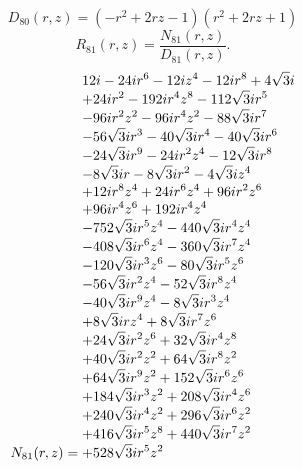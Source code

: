\documentclass[11pt,a4paper]{article}
\begin{document}
\begin{equation}
D_{80}(r,z)=\left(- r^{2} + 2 r z - 1\right) \left(r^{2} + 2 r z + 1\right)
\label{eq:cat-denominator-80}
\end{equation}
\begin{equation}
R_{81}(r,z)=\frac{N_{81}(r,z)}{D_{81}(r,z)}.
\label{eq:cat-rational-81}
\end{equation}
\begin{equation}
N_{81}(r,z)=\shortstack[l]{$\displaystyle 12 i - 24 i r^{6} - 12 i z^{4} - 12 i r^{8} + 4 \sqrt{3} i$\\
$\displaystyle  + 24 i r^{2} - 192 i r^{4} z^{8} - 112 \sqrt{3} i r^{5}$\\
$\displaystyle  - 96 i r^{2} z^{2} - 96 i r^{4} z^{2} - 88 \sqrt{3} i r^{7}$\\
$\displaystyle  - 56 \sqrt{3} i r^{3} - 40 \sqrt{3} i r^{4} - 40 \sqrt{3} i r^{6}$\\
$\displaystyle  - 24 \sqrt{3} i r^{9} - 24 i r^{2} z^{4} - 12 \sqrt{3} i r^{8}$\\
$\displaystyle  - 8 \sqrt{3} i r - 8 \sqrt{3} i r^{2} - 4 \sqrt{3} i z^{4}$\\
$\displaystyle  + 12 i r^{8} z^{4} + 24 i r^{6} z^{4} + 96 i r^{2} z^{6}$\\
$\displaystyle  + 96 i r^{4} z^{6} + 192 i r^{4} z^{4}$\\
$\displaystyle  - 752 \sqrt{3} i r^{5} z^{4} - 440 \sqrt{3} i r^{4} z^{4}$\\
$\displaystyle  - 408 \sqrt{3} i r^{6} z^{4} - 360 \sqrt{3} i r^{7} z^{4}$\\
$\displaystyle  - 120 \sqrt{3} i r^{3} z^{6} - 80 \sqrt{3} i r^{5} z^{6}$\\
$\displaystyle  - 56 \sqrt{3} i r^{2} z^{4} - 52 \sqrt{3} i r^{8} z^{4}$\\
$\displaystyle  - 40 \sqrt{3} i r^{9} z^{4} - 8 \sqrt{3} i r^{3} z^{4}$\\
$\displaystyle  + 8 \sqrt{3} i r z^{4} + 8 \sqrt{3} i r^{7} z^{6}$\\
$\displaystyle  + 24 \sqrt{3} i r^{2} z^{6} + 32 \sqrt{3} i r^{4} z^{8}$\\
$\displaystyle  + 40 \sqrt{3} i r^{2} z^{2} + 64 \sqrt{3} i r^{8} z^{2}$\\
$\displaystyle  + 64 \sqrt{3} i r^{9} z^{2} + 152 \sqrt{3} i r^{6} z^{6}$\\
$\displaystyle  + 184 \sqrt{3} i r^{3} z^{2} + 208 \sqrt{3} i r^{4} z^{6}$\\
$\displaystyle  + 240 \sqrt{3} i r^{4} z^{2} + 296 \sqrt{3} i r^{6} z^{2}$\\
$\displaystyle  + 416 \sqrt{3} i r^{5} z^{8} + 440 \sqrt{3} i r^{7} z^{2}$\\
$\displaystyle  + 528 \sqrt{3} i r^{5} z^{2}$}
\label{eq:cat-numerator-81}
\end{equation}
\end{document}
